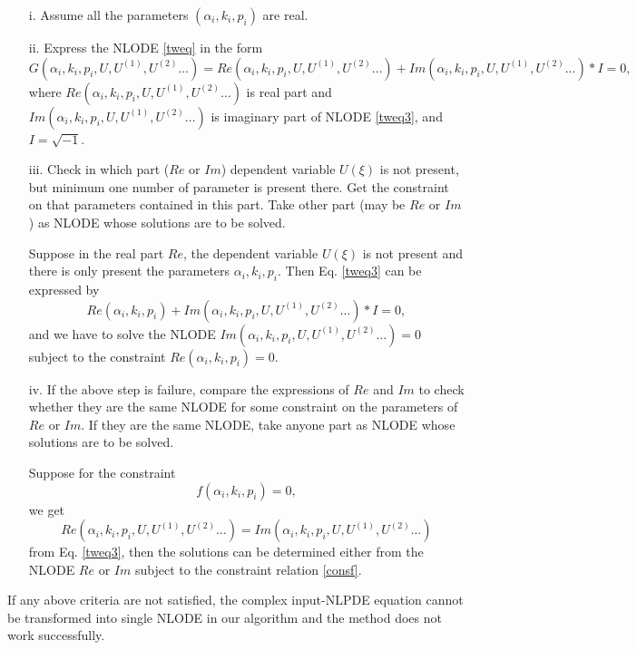 \documentclass[prd,aps,floats,showkeys,nofootinbib,notitlepage]{revtex4-2}
\begin{document}
	\begin{itemize}
		\item[i.] Assume all the parameters $(\alpha_i,k_i,p_i)$ are real.
		\item[ii.] Express the NLODE \eqref{tweq} in the form 
		\begin{equation}\label{tweq3}
			G\left( {\alpha_i,k_i,p_i,U,U^{(1)},U^{(2)}} \ldots \right) = Re\left( {\alpha_i,k_i,p_i,U,U^{(1)},U^{(2)}} \ldots \right)+Im\left( {\alpha_i,k_i,p_i,U,U^{(1)},U^{(2)}} \ldots \right)*I=0,
		\end{equation}
		where $Re\left( {\alpha_i,k_i,p_i,U,U^{(1)},U^{(2)}} \ldots \right)$ is real part and $Im\left( {\alpha_i,k_i,p_i,U,U^{(1)},U^{(2)}} \ldots \right)$ is imaginary part of NLODE \eqref{tweq3}, and $I=\sqrt{-1}$.
		\item[iii.] Check in which part ($Re$ or $Im$) dependent variable $U(\xi)$ is not present, but minimum one number of parameter is present there. Get the constraint on that parameters contained in this part. Take other part (may be $Re$ or $Im$) as NLODE whose solutions are to be solved. 
		\par Suppose in the real part $Re$, the dependent variable $U(\xi)$ is not present and there is only present the parameters $\alpha_i,k_i,p_i$. Then Eq. \eqref{tweq3} can be expressed by 
		\begin{equation}
			Re\left( {\alpha_i,k_i,p_i} \right)+Im\left( {\alpha_i,k_i,p_i,U,U^{(1)},U^{(2)}} \ldots \right)*I=0,
		\end{equation}
		and we have to solve the NLODE $Im\left( {\alpha_i,k_i,p_i,U,U^{(1)},U^{(2)}} \ldots \right)=0$ subject to the constraint $Re\left( {\alpha_i,k_i,p_i}\right)=0$.
		\item[iv.] If the above step is failure, compare the expressions of $Re$ and $Im$ to check whether they are the same NLODE for some constraint on the parameters of $Re$ or $Im$. If they are the same NLODE, take anyone part as NLODE whose solutions are to be solved.
		\par Suppose for the constraint 
		\begin{equation}\label{consf}
			f(\alpha_i,k_i,p_i)=0,
		\end{equation}
		we get
		\begin{equation}\label{reEqIm}
			Re\left( {\alpha_i,k_i,p_i,U,U^{(1)},U^{(2)}} \ldots \right)=Im\left( {\alpha_i,k_i,p_i,U,U^{(1)},U^{(2)}} \ldots \right)
		\end{equation}
		from Eq. \eqref{tweq3}, then the solutions can be determined either from the NLODE $Re$ or $Im$ subject to the constraint relation \eqref{consf}. 
	\end{itemize}
	If any above criteria are not satisfied, the complex input-NLPDE equation cannot be transformed into single NLODE in our algorithm and the method does not work
	successfully.\\
	
\end{document}
